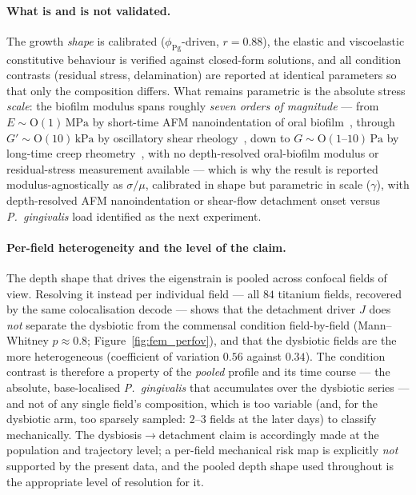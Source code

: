 \paragraph{What is and is not validated.} The growth \emph{shape} is calibrated
($\phi_\mathrm{Pg}$-driven, $r=0.88$), the elastic and viscoelastic constitutive
behaviour is verified against closed-form solutions, and all condition contrasts
(residual stress, delamination) are reported at identical parameters so that only the
composition differs. What remains parametric is the absolute stress \emph{scale}: the
biofilm modulus spans roughly \emph{seven orders of magnitude} --- from
$E\sim\mathrm{O}(1)\,\mathrm{MPa}$ by short-time AFM nanoindentation of oral
biofilm~\cite{Cense2021OralBiofilm}, through $G'\sim\mathrm{O}(10)\,\mathrm{kPa}$ by
oscillatory shear rheology~\cite{BiofilmMatrixMechanics2025}, down to
$G\sim\mathrm{O}(1\text{--}10)\,\mathrm{Pa}$ by long-time creep
rheometry~\cite{Stoodley2002Material}, with no depth-resolved oral-biofilm modulus or
residual-stress measurement available --- which is why the result is reported
modulus-agnostically as $\sigma/\mu$, calibrated in shape but parametric in scale
($\gamma$), with depth-resolved AFM nanoindentation or shear-flow detachment onset versus
\textit{P.~gingivalis} load identified as the next experiment.

\paragraph{Per-field heterogeneity and the level of the claim.} The depth shape that drives
the eigenstrain is pooled across confocal fields of view. Resolving it instead per individual
field --- all $84$ titanium fields, recovered by the same colocalisation decode --- shows that
the detachment driver $J$ does \emph{not} separate the dysbiotic from the commensal condition
field-by-field (Mann--Whitney $p\approx0.8$; Figure~\ref{fig:fem_perfov}), and that the
dysbiotic fields are the more heterogeneous (coefficient of variation $0.56$ against $0.34$).
The condition contrast is therefore a property of the \emph{pooled} profile and its time course
--- the absolute, base-localised \textit{P.~gingivalis} that accumulates over the dysbiotic
series --- and not of any single field's composition, which is too variable (and, for the
dysbiotic arm, too sparsely sampled: $2$--$3$ fields at the later days) to classify
mechanically. The dysbiosis$\rightarrow$detachment claim is accordingly made at the population
and trajectory level; a per-field mechanical risk map is explicitly \emph{not} supported by the
present data, and the pooled depth shape used throughout is the appropriate level of resolution
for it.

